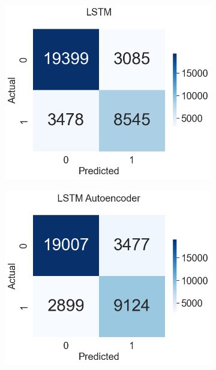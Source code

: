 \documentclass[a4paper,12pt]{report}
\theoremstyle{definitionNODot}
\begin{document}
\begin{figure}[H]
\begin{subfigure}[b]{0.35\textwidth}
			\label{fig:anomaly_by_conv_ae}
		\end{subfigure}
		\bigskip
		\begin{subfigure}[b]{0.35\textwidth}
			\centering
			\includegraphics[width=\textwidth]{anomaly_by_lstm.png}
			
			\label{fig:anomaly_by_lstm}
		\end{subfigure}
		\hfil
		\begin{subfigure}[b]{0.35\textwidth}
			\centering
			\includegraphics[width=\textwidth]{anomaly_by_lstm_ae.png}
			

\end{subfigure}
\end{figure}
\end{document}
